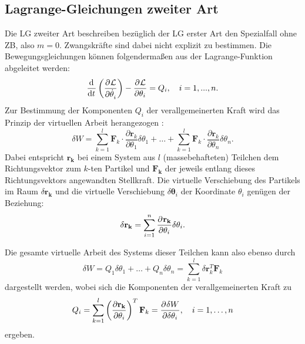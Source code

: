 \subsection{Lagrange-Gleichungen zweiter Art}
\label{sec:Lagrange2_theory}
Die LG zweiter Art beschreiben bezüglich der LG erster Art den Spezialfall ohne ZB, also $m = 0$. Zwangskräfte sind dabei nicht explizit zu bestimmen. Die Bewegungsgleichungen können folgendermaßen aus der Lagrange-Funktion abgeleitet werden:
\begin{equation}
	\label{eq:lagrange2}
	\frac{\mathrm{d}^{}}{\mathrm{d}{t}^{}}\left(\frac{\partial^{}\mathcal{L}}{\partial{\dot{\theta}_i}^{}} \right) - \frac{\partial^{}\mathcal{L}}{\partial{\theta_i}^{}} = Q_i, \quad i = 1, ..., n.
\end{equation}
Zur Bestimmung der Komponenten $Q_i$ der verallgemeinerten Kraft wird das Prinzip der virtuellen Arbeit herangezogen \cite{VirtualWork}:
\begin{equation}
	\delta W = \sum_{k=1}^l \mathbf{F}_k \cdot \frac{\partial \mathbf{r}_k}{\partial \theta_1} \delta \theta_1 +\ldots + \sum_{k=1}^l \mathbf{F}_k \cdot \frac{\partial \mathbf{r}_k}{\partial \theta_n} \delta \theta_n.
\end{equation}
Dabei entspricht $\mathbf{r_k}$ bei einem System aus $l$ (massebehafteten) Teilchen dem Richtungsvektor zum $k$-ten Partikel und $\mathbf{F_k}$ der jeweils entlang dieses Richtungsvektors angewandten Stellkraft. Die virtuelle Verschiebung des Partikels im Raum $\delta \mathbf{r_{k}}$ und die virtuelle Verschiebung $\delta \boldsymbol{\theta}_{i}$ der Koordinate $\theta_i$ genügen der Beziehung:
\begin{equation}
	\delta \mathbf{r_{k}} = \sum_{i = 1}^{n} \frac{\partial^{}\mathbf{r_{k}}}{\partial{\theta_i}^{}} \delta \theta_i .
\end{equation}

Die gesamte virtuelle Arbeit des Systems dieser Teilchen kann also ebenso durch
\begin{equation}
\label{eq:virtual_work}
\delta W = Q_1 \delta \theta_1 + \ldots + Q_n\delta \theta_n = \sum_{k=1}^{l}\delta \mathbf{r}_k^T \mathbf{F}_k
\end{equation}
dargestellt werden, wobei sich die Komponenten der verallgemeinerten Kraft zu
\begin{equation}
\label{eq:virtual_work_force}
Q_i = \sum_{k=1}^l \left(\frac {\partial \mathbf{r_k}} {\partial \theta_i} \right)^T \mathbf {F}_{k} = \frac{\partial^{}\delta W}{\partial{\delta \theta_i}^{}} ,\quad i=1,\ldots, n 
\end{equation}
ergeben.
